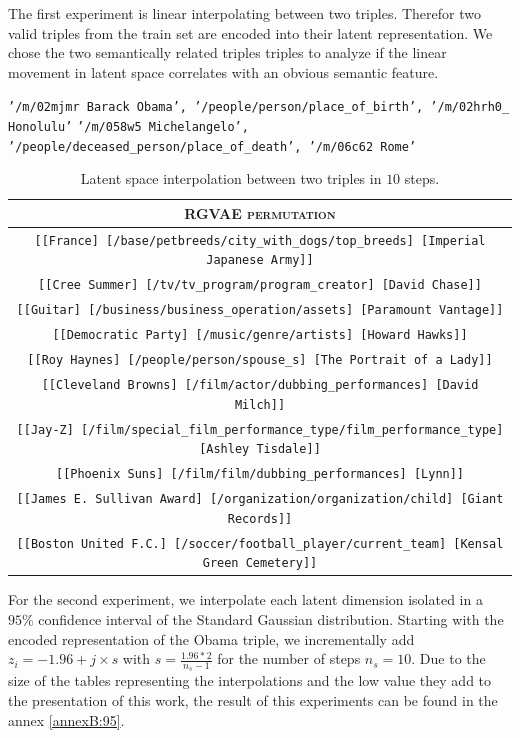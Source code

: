 The first experiment is linear interpolating between two triples. Therefor two valid triples from the train set are encoded into their latent representation. We chose the two semantically related triples triples to analyze if the linear movement in latent space correlates with an obvious semantic feature. 

\begin{center}
  \texttt{'/m/02mjmr Barack Obama', '/people/person/place\_of\_birth', '/m/02hrh0\_	Honolulu'}
  \texttt{'/m/058w5 Michelangelo', '/people/deceased\_person/place\_of\_death', '/m/06c62	Rome'}
\end{center}



\begin{table}[H]
  \centering
  \begin{tabular}{|c|}
  \hline
  \rowcolor[HTML]{EFEFEF} 
  \textsc{RGVAE permutation}\\ \hline
  \texttt{[[France] [/base/petbreeds/city\_with\_dogs/top\_breeds] [Imperial Japanese Army]]}\\
  \texttt{[[Cree Summer] [/tv/tv\_program/program\_creator] [David Chase]]}\\
  \texttt{[[Guitar] [/business/business\_operation/assets] [Paramount Vantage]]}\\
  \texttt{[[Democratic Party] [/music/genre/artists] [Howard Hawks]]}\\
  \texttt{[[Roy Haynes] [/people/person/spouse\_s] [The Portrait of a Lady]]}\\
  \texttt{[[Cleveland Browns] [/film/actor/dubbing\_performances] [David Milch]]}\\
  \texttt{[[Jay-Z] [/film/special\_film\_performance\_type/film\_performance\_type] [Ashley Tisdale]]}\\
  \texttt{[[Phoenix Suns] [/film/film/dubbing\_performances] [Lynn]]}\\
  \texttt{[[James E. Sullivan Award] [/organization/organization/child] [Giant Records]]}\\
  \texttt{[[Boston United F.C.] [/soccer/football\_player/current\_team] [Kensal Green Cemetery]]}\\  
  \hline
  \end{tabular}
\caption{Latent space interpolation between two triples in $10$ steps.}
\label{tab5:ipbtw2}
\end{table}

For the second experiment, we interpolate each latent dimension isolated in a $95\%$ confidence interval of the Standard Gaussian distribution. Starting with the encoded representation of the Obama triple, we incrementally add $z_{i} = -1.96 + j \times s$ with $s = \frac{1.96 * 2}{n_s-1}$ for the number of steps $n_s = 10$. Due to the size of the tables representing the interpolations and the low value they add to the presentation of this work, the result of this experiments can be found in the annex \ref{annexB:95}.


